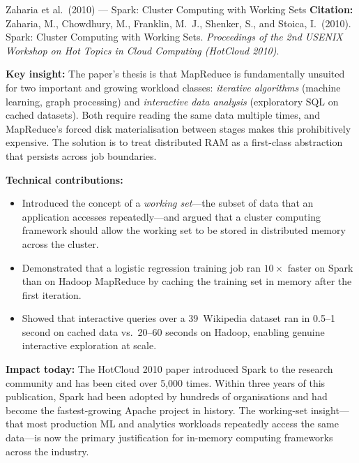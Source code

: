 \begin{researchspotlight}{Zaharia et al.\ (2010) --- Spark: Cluster Computing with Working Sets}
\textbf{Citation:} Zaharia, M., Chowdhury, M., Franklin, M.~J.,
Shenker, S., and Stoica, I.\ (2010). Spark: Cluster Computing with
Working Sets. \textit{Proceedings of the 2nd USENIX Workshop on Hot
Topics in Cloud Computing (HotCloud 2010)}.
\parencite{Spark2010}

\smallskip\noindent
\textbf{Key insight:} The paper's thesis is that MapReduce is fundamentally
unsuited for two important and growing workload classes: \emph{iterative
algorithms} (machine learning, graph processing) and \emph{interactive
data analysis} (exploratory SQL on cached datasets). Both require
reading the same data multiple times, and MapReduce's forced disk
materialisation between stages makes this prohibitively expensive.
The solution is to treat distributed RAM as a first-class abstraction
that persists across job boundaries.

\smallskip\noindent
\textbf{Technical contributions:}
\begin{itemize}
  \item Introduced the concept of a \emph{working set}---the subset of
        data that an application accesses repeatedly---and argued that
        a cluster computing framework should allow the working set to be
        stored in distributed memory across the cluster.
  \item Demonstrated that a logistic regression training job ran
        $10\times$ faster on Spark than on Hadoop MapReduce by caching
        the training set in memory after the first iteration.
  \item Showed that interactive queries over a 39\GB\ Wikipedia dataset
        ran in 0.5--1 second on cached data vs.\ 20--60 seconds on
        Hadoop, enabling genuine interactive exploration at scale.
\end{itemize}

\smallskip\noindent
\textbf{Impact today:} The HotCloud 2010 paper introduced Spark to the
research community and has been cited over 5{,}000 times. Within three
years of this publication, Spark had been adopted by hundreds of
organisations and had become the fastest-growing Apache project in
history. The working-set insight---that most production ML and analytics
workloads repeatedly access the same data---is now the primary
justification for in-memory computing frameworks across the industry.
\end{researchspotlight}

